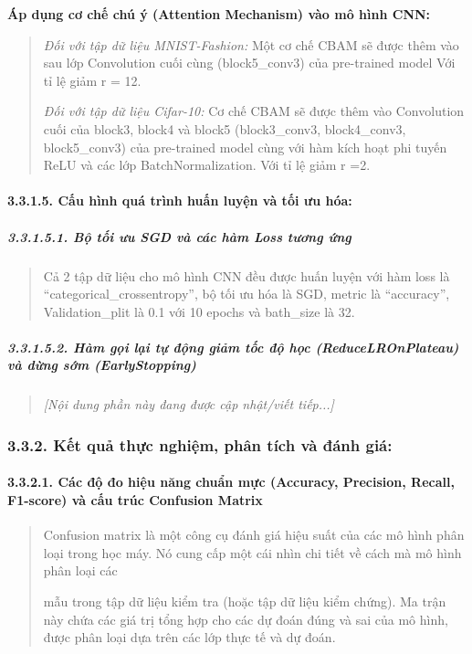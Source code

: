\documentclass[
]{article}
\begin{document}
\textbf{Áp dụng cơ chế chú ý (Attention Mechanism) vào mô hình CNN:}

\begin{quote}
\emph{Đối với tập dữ liệu MNIST-Fashion:} Một cơ chế CBAM sẽ được thêm
vào sau lớp Convolution cuối cùng (block5\_conv3) của pre-trained model
Với tỉ lệ giảm r = 12.

\emph{Đối với tập dữ liệu Cifar-10:} Cơ chế CBAM sẽ được thêm vào
Convolution cuối của block3, block4 và block5 (block3\_conv3,
block4\_conv3, block5\_conv3) của pre-trained model cùng với hàm kích
hoạt phi tuyến ReLU và các lớp BatchNormalization. Với tỉ lệ giảm r =2.
\end{quote}

\paragraph{3.3.1.5. Cấu hình quá trình huấn luyện và tối ưu hóa:}\label{3-3-1-5-training-config}

\subparagraph{3.3.1.5.1. Bộ tối ưu SGD và các hàm Loss tương ứng}\label{3-3-1-5-1-sgd-loss}

\begin{quote}
Cả 2 tập dữ liệu cho mô hình CNN đều được huấn luyện với hàm loss là
``categorical\_crossentropy'', bộ tối ưu hóa là SGD, metric là
``accuracy'', Validation\_plit là 0.1 với 10 epochs và bath\_size là 32.
\end{quote}

\subparagraph{3.3.1.5.2. Hàm gọi lại tự động giảm tốc độ học (ReduceLROnPlateau) và dừng sớm (EarlyStopping)}\label{3-3-1-5-2-callbacks}
\begin{quote}
\emph{[Nội dung phần này đang được cập nhật/viết tiếp...]}
\end{quote}

\subsubsection{3.3.2. Kết quả thực nghiệm, phân tích và đánh giá:}\label{kux1ebft-quux1ea3-thux1ef1c-nghiux1ec7m-vuxe0-ux111uxe1nh-giuxe1}

\paragraph{3.3.2.1. Các độ đo hiệu năng chuẩn mực (Accuracy, Precision, Recall, F1-score) và cấu trúc Confusion Matrix}\label{3-3-2-1-metrics}

\begin{quote}
Confusion matrix là một công cụ đánh giá hiệu suất của các mô hình phân
loại trong học máy. Nó cung cấp một cái nhìn chi tiết về cách mà mô hình
phân loại các

mẫu trong tập dữ liệu kiểm tra (hoặc tập dữ liệu kiểm chứng). Ma trận
này chứa các giá trị tổng hợp cho các dự đoán đúng và sai của mô hình,
được phân loại dựa trên các lớp thực tế và dự đoán.
\end{quote}
\end{document}
